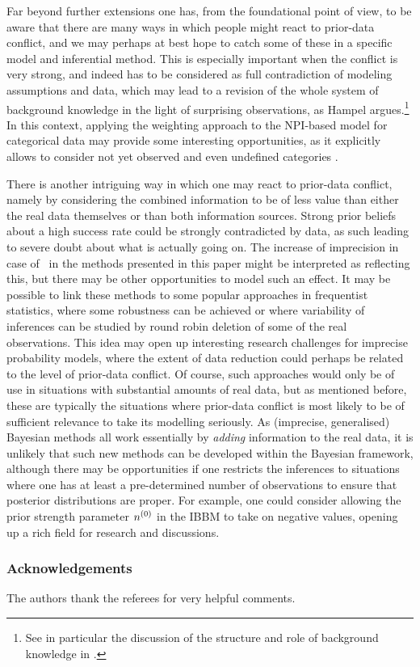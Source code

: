 Far beyond further extensions %
one has, from the foundational point of view, to be aware that there are
many ways in which people might react to prior-data conflict, and we
may perhaps at best hope to catch some of these in a specific
model and inferential method.
This is especially important when the conflict is very strong, and
indeed has to be considered as full contradiction of modeling
assumptions and data, which may lead to a revision of the whole
system of background knowledge in the light of surprising
observations, as Hampel argues.\footnote{See in particular the discussion of the
structure and role of background knowledge in \textcite{2009:hampel:knowledge}.}
In this context, applying the weighting approach to the NPI-based model
for categorical data \parencite{2009:Coolen:Augustin} may provide some
interesting opportunities, as it explicitly allows to consider not yet observed and
even undefined categories \parencite{2005:Coolen:Augustin}.

There is another intriguing way in which one may react to prior-data
conflict, namely by considering the combined information to be of
less value than either the real data themselves or than both
information sources. Strong prior beliefs about
a high success rate could be strongly contradicted by data, as such
leading to severe doubt about what is actually going on. The increase of
imprecision in case of \pdc\ in the methods presented in this paper
might be interpreted as reflecting this, but there may be other
opportunities to model such an effect. It may be possible to link these
methods to some popular approaches in frequentist statistics, where some robustness
can be achieved or where variability of inferences can be studied by
round robin deletion of some of the real observations. %
This idea may open up interesting research challenges for imprecise probability
models, where the extent of data reduction could perhaps be
related to the level of prior-data conflict. Of course, such
approaches would only be of use in situations with substantial
amounts of real data, but as mentioned before, these are typically
the situations where prior-data conflict is most likely to be of
sufficient relevance to take its modelling seriously. As (imprecise,
generalised) Bayesian methods all work essentially by \emph{adding}
information to the real data, it is unlikely that such new methods
can be developed within the Bayesian framework, although there may
be opportunities if one restricts the inferences to situations where
one has at least a pre-determined number of observations to ensure
that posterior distributions are proper. For example, one could
consider allowing the prior strength parameter
$n^{(0)}$ in the IBBM to take on negative values, opening up a rich
field for research and discussions.


\subsubsection*{Acknowledgements}%

The authors thank the referees for very helpful comments.




